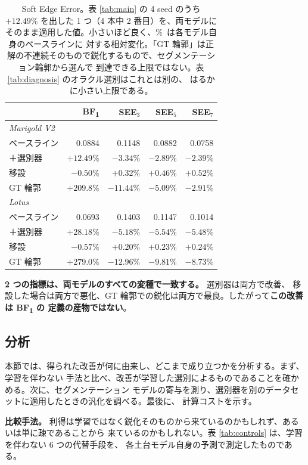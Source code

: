 \documentclass[conference]{IEEEtran}
\newcommand{\bfone}{BF\textsubscript{1}}
\begin{document}
\begin{table}[t]
\caption{Soft Edge Error。表 \ref{tab:main} の 4 seed のうち $+12.49\%$ を出した
1 つ（4 本中 2 番目）を、両モデルにそのまま適用した値。小さいほど良く、\%\ は各モデル自身のベースラインに
対する相対変化。「GT 輪郭」は正解の不連続そのもので鋭化するもので、セグメンテーション輪郭から選んで
到達できる上限ではない。表 \ref{tab:diagnosis} のオラクル選別はこれとは別の、
はるかに小さい上限である。}
\label{tab:see}
\centering
\begin{tabular}{lrrrr}
\toprule
& \bfone{} & SEE$_3$ & SEE$_5$ & SEE$_7$ \\
\midrule
\multicolumn{5}{l}{\emph{Marigold V2}} \\
ベースライン & 0.0884 & 0.1148 & 0.0882 & 0.0758 \\
＋選別器 & $+12.49\%$ & $-3.34\%$ & $-2.89\%$ & $-2.39\%$ \\
移設 & $-0.50\%$ & $+0.32\%$ & $+0.46\%$ & $+0.52\%$ \\
GT 輪郭 & $+209.8\%$ & $-11.44\%$ & $-5.09\%$ & $-2.91\%$ \\
\midrule
\multicolumn{5}{l}{\emph{Lotus}} \\
ベースライン & 0.0693 & 0.1403 & 0.1147 & 0.1014 \\
＋選別器 & $+28.18\%$ & $-5.18\%$ & $-5.54\%$ & $-5.48\%$ \\
移設 & $-0.57\%$ & $+0.20\%$ & $+0.23\%$ & $+0.24\%$ \\
GT 輪郭 & $+279.0\%$ & $-12.96\%$ & $-9.81\%$ & $-8.73\%$ \\
\bottomrule
\end{tabular}
\end{table}

\textbf{2 つの指標は、両モデルのすべての変種で一致する。} 選別器は両方で改善、
移設した場合は両方で悪化、GT 輪郭での鋭化は両方で最良。したがって\textbf{この改善は \bfone{} の
定義の産物ではない}。

\subsection{分析}

本節では、得られた改善が何に由来し、どこまで成り立つかを分析する。まず、学習を伴わない
手法と比べ、改善が学習した選別によるものであることを確かめる。次に、セグメンテーション
モデルの寄与を測り、選別器を別のデータセットに適用したときの汎化を調べる。最後に、
計算コストを示す。

\textbf{比較手法。}\label{sec:controls} 利得は学習ではなく鋭化そのものから来ているのかもしれず、あるいは単に疎であることから
来ているのかもしれない。表 \ref{tab:controls} は、学習を伴わない 6 つの代替手段を、
各土台モデル自身の予測で測定したものである。
\end{document}
